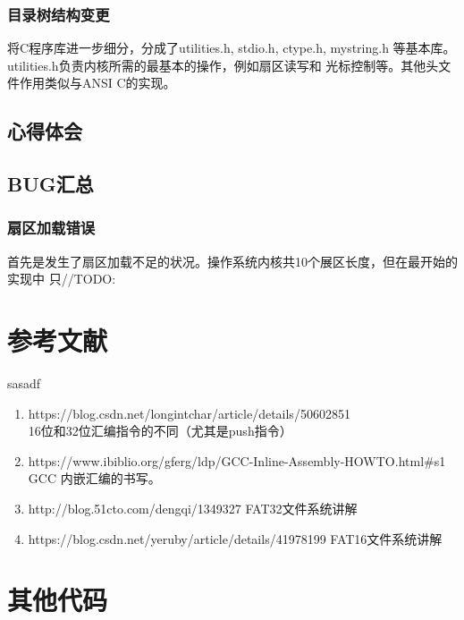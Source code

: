 \documentclass[a4paper]{article}
\begin{document}
    \subsubsection{目录树结构变更}
    将C程序库进一步细分，分成了utilities.h, stdio.h, ctype.h, mystring.h 
    等基本库。utilities.h负责内核所需的最基本的操作，例如扇区读写和
    光标控制等。其他头文件作用类似与ANSI C的实现。
    \subsection{心得体会}
 
    \subsection{BUG汇总}
    \subsubsection{扇区加载错误}
    首先是发生了扇区加载不足的状况。操作系统内核共10个展区长度，但在最开始的实现中
    只//TODO:
\begin{appendices}
\section{参考文献} \label{sec:reference}
sasadf
\begin{enumerate}
    \item https://blog.csdn.net/longintchar/article/details/50602851 \\
    16位和32位汇编指令的不同（尤其是push指令）
    \item https://www.ibiblio.org/gferg/ldp/GCC-Inline-Assembly-HOWTO.html\#s1 \\
    GCC 内嵌汇编的书写。
    \item http://blog.51cto.com/dengqi/1349327
    FAT32文件系统讲解
    \item https://blog.csdn.net/yeruby/article/details/41978199
    FAT16文件系统讲解
  \end{enumerate}
\section{其他代码} \label{sec:otherCode}
\end{appendices}
\end{document}
